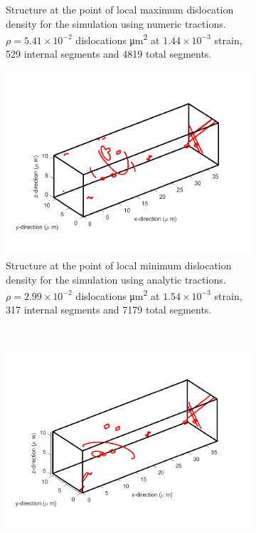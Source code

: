\begin{figure}
\begin{subfigure}[t]{0.45\linewidth}
        \caption[Structure at the point of local maximum dislocation density for the simulation using analytic tractions.]{Structure at the point of local maximum dislocation density for the simulation using numeric tractions. $\rho = 5.41\times 10^{-2}$ dislocations \si{\micro\metre^{2}} at $1.44 \times 10^{-3}$ strain, 529 internal segments and 4819 total segments.}
        \label{sf:maxDensNum}
    \end{subfigure}

    \begin{subfigure}[t]{0.45\linewidth}
        \centering
        \includegraphics[width=\linewidth]{../data/minDens_nSeg_317_nSegTot_7179_11-Mar-2021_8_tensile_ni_100.pdf}
        \caption[Structure at the point of local minimum dislocation density for the simulation using analytic tractions.]{Structure at the point of local minimum dislocation density for the simulation using analytic tractions. $\rho = 2.99\times 10^{-2}$ dislocations \si{\micro\metre^{2}} at $1.54\times 10^{-3}$ strain, 317 internal segments and 7179 total segments.}
        \label{sf:minDensAna}
    \end{subfigure}
    ~
    \begin{subfigure}[t]{0.45\linewidth}
        \centering
        \includegraphics[width=\linewidth]{../data/minDens_nSeg_204_nSegTot_8204_11-Mar-2021_numT_8_tensile_ni_100.pdf}

\end{subfigure}
\end{figure}
